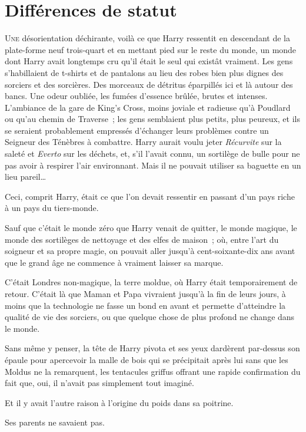 \chapter{Différences de statut}

\lettrine{U}{ne} désorientation déchirante, voilà ce que Harry ressentit en descendant de la plate-forme neuf trois-quart et en mettant pied sur le reste du monde, un monde dont Harry avait longtemps cru qu'il était le seul qui existât vraiment. Les gens s'habillaient de t-shirts et de pantalons au lieu des robes bien plus dignes des sorciers et des sorcières. Des morceaux de détritus éparpillés ici et là autour des bancs. Une odeur oubliée, les fumées d'essence brûlée, brutes et intenses. L'ambiance de la gare de King's Cross, moins joviale et radieuse qu'à Poudlard ou qu'au chemin de Traverse~; les gens semblaient plus petits, plus peureux, et ils se seraient probablement empressés d'échanger leurs problèmes contre un Seigneur des Ténèbres à combattre. Harry aurait voulu jeter \emph{Récurvite} sur la saleté et \emph{Everto} sur les déchets, et, s'il l'avait connu, un sortilège de bulle pour ne pas avoir à respirer l'air environnant. Mais il ne pouvait utiliser sa baguette en un lieu pareil…

Ceci, comprit Harry, était ce que l'on devait ressentir en passant d'un pays riche à un pays du tiers-monde.

Sauf que c'était le monde zéro que Harry venait de quitter, le monde magique, le monde des sortilèges de nettoyage et des elfes de maison~; où, entre l'art du soigneur et sa propre magie, on pouvait aller jusqu'à cent-soixante-dix ans avant que le grand âge ne commence à vraiment laisser sa marque.

C'était Londres non-magique, la terre moldue, où Harry était temporairement de retour. C'était là que Maman et Papa vivraient jusqu'à la fin de leurs jours, à moins que la technologie ne fasse un bond en avant et permette d'atteindre la qualité de vie des sorciers, ou que quelque chose de plus profond ne change dans le monde.

Sans même y penser, la tête de Harry pivota et ses yeux dardèrent par-dessus son épaule pour apercevoir la malle de bois qui se précipitait après lui sans que les Moldus ne la remarquent, les tentacules griffus offrant une rapide confirmation du fait que, oui, il n'avait pas simplement tout imaginé.

Et il y avait l'autre raison à l'origine du poids dans sa poitrine.

Ses parents ne savaient pas.

